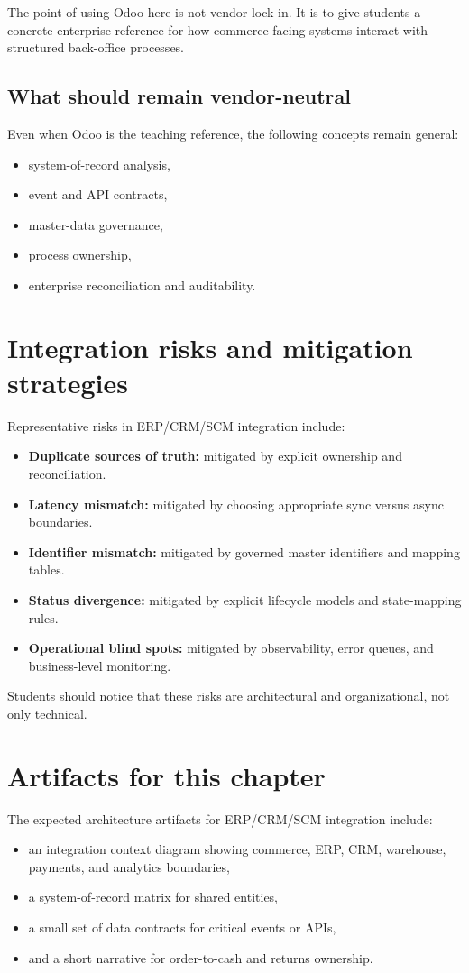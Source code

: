 The point of using Odoo here is not vendor lock-in.
It is to give students a concrete enterprise reference for how commerce-facing systems interact with structured back-office processes.

\subsection{What should remain vendor-neutral}
Even when Odoo is the teaching reference, the following concepts remain general:
\begin{itemize}
  \item system-of-record analysis,
  \item event and API contracts,
  \item master-data governance,
  \item process ownership,
  \item enterprise reconciliation and auditability.
\end{itemize}

\section{Integration risks and mitigation strategies}
Representative risks in ERP/CRM/SCM integration include:
\begin{itemize}
  \item \textbf{Duplicate sources of truth:} mitigated by explicit ownership and reconciliation.
  \item \textbf{Latency mismatch:} mitigated by choosing appropriate sync versus async boundaries.
  \item \textbf{Identifier mismatch:} mitigated by governed master identifiers and mapping tables.
  \item \textbf{Status divergence:} mitigated by explicit lifecycle models and state-mapping rules.
  \item \textbf{Operational blind spots:} mitigated by observability, error queues, and business-level monitoring.
\end{itemize}

Students should notice that these risks are architectural and organizational, not only technical.

\section{Artifacts for this chapter}
The expected architecture artifacts for ERP/CRM/SCM integration include:
\begin{itemize}
  \item an integration context diagram showing commerce, ERP, CRM, warehouse, payments, and analytics boundaries,
  \item a system-of-record matrix for shared entities,
  \item a small set of data contracts for critical events or APIs,
  \item and a short narrative for order-to-cash and returns ownership.
\end{itemize}

